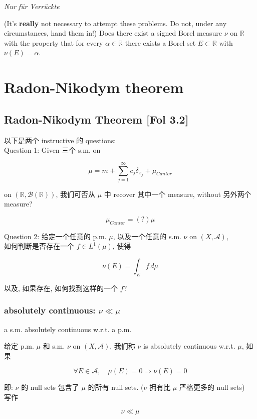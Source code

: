 \documentclass{qlnotes-export}
\begin{document}
\emph{Nur für Verrückte}

(It's \textbf{really} not necessary to attempt these problems. Do not, under any circumstances, hand them in!) Does there exist a signed Borel measure \(\nu\) on \(\mathbb{R}\) with the property that for every \(\alpha \in {\mathbb{R}}\) there exists a Borel set \(E \subset {\mathbb{R}}\) with \(\nu(E) = \alpha\).

\chapter{Radon-Nikodym theorem}\label{radon-nikodym-theorem}

\section{Radon-Nikodym Theorem {[}Fol 3.2{]}}

以下是两个 instructive 的 questions:\\
Question 1: Given 三个 s.m. on

\[\mu = m + \sum\limits_{j = 1}^{\infty}c_{j}\delta_{x_{j}} + \mu_{Cantor}\]

on \(({\mathbb{R}},\mathcal{B}({\mathbb{R}}))\), 我们可否从 \(\mu\) 中 recover 其中一个 measure, without 另外两个 measure?

\[\mu_{Cantor} = (?)\mu\]

Question 2: 给定一个任意的 p.m. \(\mu\), 以及一个任意的 s.m. \(\nu\) on \((X,\mathcal{A})\),\\
如何判断是否存在一个 \(f \in L^{1}(\mu)\), 使得

\[\nu(E) = \int_{E}f\, d\mu\]

以及, 如果存在, 如何找到这样的一个 \(f\)?

\subsection{\texorpdfstring{absolutely continuous: \(\nu \ll \mu\)}{absolutely continuous: \textbackslash nu \textbackslash ll \textbackslash mu}}\label{absolutely-continuous-nu-ll-mu}

\begin{definition}{a s.m. absolutely continuous w.r.t. a p.m.}\label{def-11-radon-nikodym-theorem-a-s-m-absolutely-continuous-w-r-t-a-p-m}

给定 p.m. \(\mu\) 和 s.m. \(\nu\) on \((X,\mathcal{A})\), 我们称 \(\nu\) is absolutely continuous w.r.t. \(\mu\), 如果

\[\forall E \in \mathcal{A},\quad\mu(E) = 0\Longrightarrow\nu(E) = 0\]

即: \(\nu\) 的 null sets 包含了 \(\mu\) 的所有 null sets. (\(\nu\) 拥有比 \(\mu\) 严格更多的 null sets)\\
写作

\[\nu \ll \mu\]

\end{definition}
\end{document}
